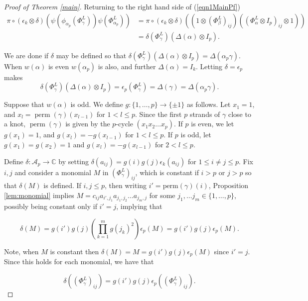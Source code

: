 \documentclass[11pt]{amsart}
\def\C{{\mathbb C}}
\def\A{{\mathcal A}}
\newcommand\perm{\operatorname{perm}}
\theoremstyle{definition}
\begin{document}
\begin{proof}[Proof of Theorem \ref{main}]
\noindent Returning to the right hand side of (\ref{eqn1MainPf})
\begin{align*}
\pi\circ(\epsilon_k\otimes\delta)\left(\psi\left(\phi_{\alpha_p}\left(\Phi_{\gamma}^L\right)\right)\psi\left(\Phi_{\alpha_p}^L\right)\right)
    & = \pi\circ(\epsilon_k\otimes\delta)\left(\left(1\otimes \left(\Phi_{\beta}^L\right)_{ij}\right)\left(\left(\Phi_\alpha^L\otimes I_p\right)_{ij}\otimes 1\right)\right)\\
    & = \delta\left(\Phi_{\gamma}^L\right)\left(\Delta(\alpha)\otimes I_p\right).
\end{align*}

We are done if $\delta$ may be defined so that $\delta\left(\Phi_{\gamma}^L\right)\left(\Delta(\alpha)\otimes I_p\right) = \Delta(\alpha_p\gamma)$.  When $w(\alpha)$ is even $w(\alpha_p)$ is also, and further $\Delta(\alpha)=I_k$. Letting $\delta = \epsilon_p$ makes 
\begin{equation*}
\delta\left(\Phi_{\gamma}^L\right)\left(\Delta(\alpha)\otimes I_p\right) = \epsilon_p\left(\Phi_{\gamma}^L\right) = \Delta(\gamma) = \Delta(\alpha_p\gamma).
\end{equation*}

Suppose that $w(\alpha)$ is odd. We define $g\colon \{1,\ldots,p\}\rightarrow \{\pm 1\}$ as follows. Let $x_1 = 1$, and $x_l = \perm(\gamma)(x_{l-1})$ for $1<l\le p$. Since the first $p$ strands of $\gamma$ close to a knot, $\perm(\gamma)$ is given by the $p$-cycle $(x_1x_2\ldots x_p)$. If $p$ is even, we let $g(x_1) = 1$, and $g(x_l) = -g(x_{l-1})$ for $1<l\le p$. If $p$ is odd, let $g(x_1) = g(x_2) = 1$ and $g(x_l) = -g(x_{l-1})$ for $2<l\le p$.

 Define $\delta: \A_p\to \C$ by setting $\delta(a_{ij}) = g(i)g(j)\epsilon_k(a_{ij})$ for $1\le i\ne j\le p$. Fix $i,j$ and consider a monomial $M$ in $\left(\Phi_{\gamma}^L\right)_{ij}$, which is constant if $i>p$ or $j>p$ so that $\delta(M)$ is defined. If $i,j\le p$, then writing $i'=\text{perm}(\gamma)(i)$, Proposition \ref{lem:monomial} implies $M=c_{ij}a_{i',j_1}a_{j_1,j_2}\ldots a_{j_m,j}$ for some $j_1,\ldots j_m\in \{1,\ldots,p\}$, possibly being constant only if $i'=j$, implying that 

$$\delta(M) = g(i')g(j)\left(\prod_{k=1}^m g(j_k)^2\right)\epsilon_p(M) = g(i')g(j)\epsilon_p(M).$$

\noindent Note, when $M$ is constant then $\delta(M) = M = g(i')g(j)\epsilon_p(M)$ since $i'=j$. Since this holds for each monomial, we have that

$$\delta\left(\left(\Phi_{\gamma}^L\right)_{ij}\right) = g(i')g(j)\epsilon_p\left(\left(\Phi_{\gamma}^L\right)_{ij}\right).$$


\end{proof}
\end{document}
